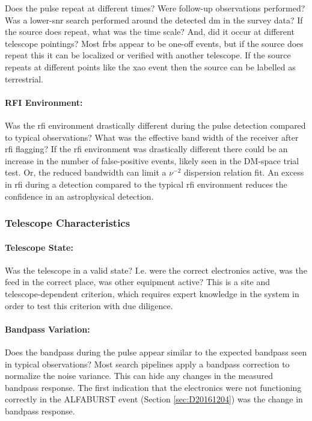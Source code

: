 \documentclass[a4paper,fleqn,usenatbib]{mnras}
\begin{document}
Does the pulse repeat at different times? Were follow-up observations performed?
Was a lower-\gls{snr} search performed around the detected \gls{dm} in the
survey data? If the source does repeat, what was the time scale? And, did it
occur at different telescope pointings? Most \glspl{frb} appear to be one-off
events, but if the source does repeat this it can be localized or verified with
another telescope. If the source repeats at different points like the \gls{xao}
event then the source can be labelled as terrestrial.

\paragraph{RFI Environment:}

Was the \gls{rfi} environment drastically different during the pulse detection
compared to typical observations? What was the effective band width of the
receiver after \gls{rfi} flagging? If the \gls{rfi} environment was drastically
different there could be an increase in the number of false-positive events,
likely seen in the DM-space trial test. Or, the reduced bandwidth can limit a
$\nu^{-2}$ dispersion relation fit. An excess in \gls{rfi} during a detection
compared to the typical \gls{rfi} environment reduces the confidence in an
astrophysical detection.

\subsubsection{Telescope Characteristics}

\paragraph{Telescope State:}

Was the telescope in a valid state? I.e. were the correct electronics active,
was the feed in the correct place, was other equipment active? This is a site
and telescope-dependent criterion, which requires expert knowledge in the
system in order to test this criterion with due diligence.

\paragraph{Bandpass Variation:}

Does the bandpass during the pulse appear similar to the expected bandpass seen
in typical observations? Most search pipelines apply a bandpass correction to
normalize the noise variance. This can hide any changes in the measured bandpass
response. The first indication that the electronics were not functioning
correctly in the ALFABURST event (Section \ref{sec:D20161204}) was the change in
bandpass response.
\end{document}
